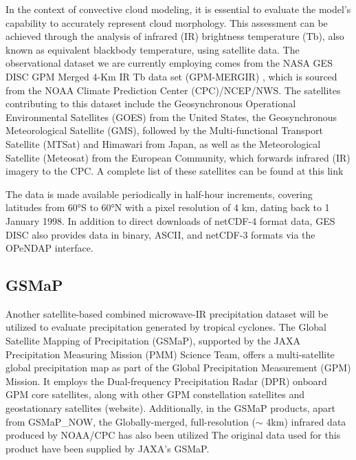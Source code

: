 In the context of convective cloud modeling, it is essential to evaluate the model's capability to accurately represent cloud morphology. This assessment can be achieved through the analysis of infrared (IR) brightness temperature (Tb), also known as equivalent blackbody temperature, using satellite data. The observational dataset we are currently employing comes from the NASA GES DISC GPM Merged 4-Km IR Tb data set (GPM-MERGIR) \cite{janowiak2017ncep}, which is sourced from the NOAA Climate Prediction Center (CPC)/NCEP/NWS. The satellites contributing to this dataset include the Geosynchronous Operational Environmental Satellites (GOES) from the United States, the Geosynchronous Meteorological Satellite (GMS), followed by the Multi-functional Transport Satellite (MTSat) and Himawari from Japan, as well as the Meteorological Satellite (Meteosat) from the European Community, which forwards infrared (IR) imagery to the CPC. A complete list of these satellites can be found at this link %

The data is made available periodically in half-hour increments, covering latitudes from 60°S to 60°N with a pixel resolution of 4 km, dating back to 1 January 1998. In addition to direct downloads of netCDF-4 format data, GES DISC also provides data in binary, ASCII, and netCDF-3 formats via the OPeNDAP interface.

\subsection{GSMaP}
\label{section315}

Another satellite-based combined microwave-IR precipitation dataset will be utilized to evaluate precipitation generated by tropical cyclones. The Global Satellite Mapping of Precipitation (GSMaP), supported by the JAXA Precipitation Measuring Mission (PMM) Science Team, offers a multi-satellite global precipitation map as part of the Global Precipitation Measurement (GPM) Mission. It employs the Dual-frequency Precipitation Radar (DPR) onboard GPM core satellites, along with other GPM constellation satellites and geostationary satellites (website). Additionally, in the GSMaP products, apart from GSMaP\_NOW, the Globally-merged, full-resolution ($\sim$ 4km) infrared data produced by NOAA/CPC has also been utilized %
The original data used for this product have been supplied by JAXA’s GSMaP.

